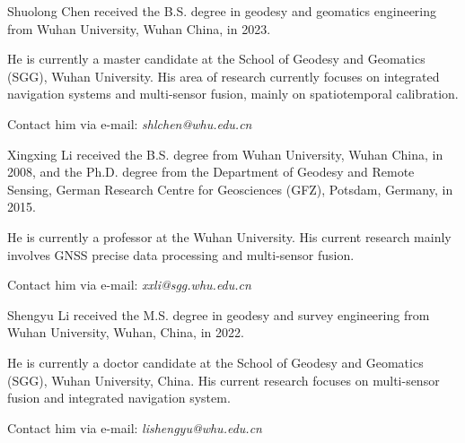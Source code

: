 \documentclass[lettersize,journal,twoside]{IEEEtran}
\begin{document}


\newcommand{\vspacebio}{\vspace{-1.2cm}}
\vspacebio
\begin{IEEEbiography}{Shuolong Chen}
	received the B.S. degree in geodesy and geomatics engineering from Wuhan University, Wuhan China, in 2023.
	
	He is currently a master candidate at the School of Geodesy and Geomatics (SGG), Wuhan University. His area of research currently focuses on integrated navigation systems and multi-sensor fusion, mainly on spatiotemporal calibration.
	
	Contact him via	e-mail: \emph{shlchen@whu.edu.cn}
\end{IEEEbiography}
\vspacebio
\begin{IEEEbiography}{Xingxing Li}
	received the B.S. degree from Wuhan University, Wuhan China, in 2008, and the Ph.D. degree from the Department of Geodesy and Remote Sensing, German Research Centre for Geosciences (GFZ), Potsdam, Germany, in 2015.
	
	He is currently a professor at the Wuhan University. His current research mainly involves GNSS precise data processing and multi-sensor fusion.
	
	Contact him via	e-mail: \emph{xxli@sgg.whu.edu.cn}
\end{IEEEbiography}
\vspacebio
\begin{IEEEbiography}{Shengyu Li}
	received the M.S. degree in	geodesy and survey engineering from Wuhan University, Wuhan, China, in 2022.
	
	He is currently a doctor candidate at the School of Geodesy and Geomatics (SGG), Wuhan University, China. His current research focuses on multi-sensor fusion and integrated navigation system.
	
	Contact him via	e-mail: \emph{lishengyu@whu.edu.cn}
\end{IEEEbiography}
\end{document}
